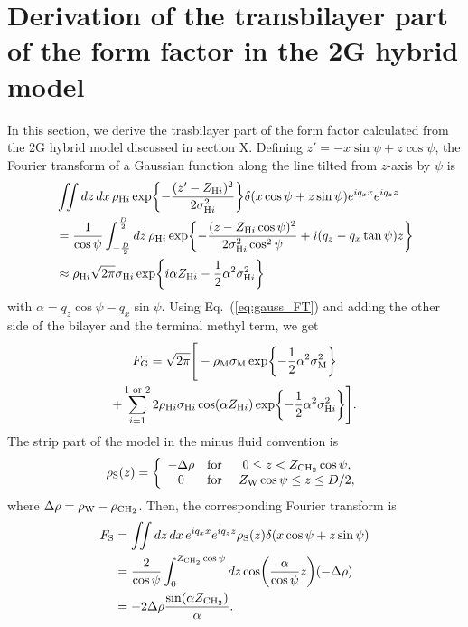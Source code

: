 \section{Derivation of the transbilayer part of the form factor in the 2G hybrid model}
In this section, we derive the trasbilayer part of the form factor calculated
from the 2G hybrid model discussed in section X.
Defining $z'=-x\sin\psi+z\cos\psi$, the Fourier transform of a Gaussian function 
along the line tilted from $z$-axis by $\psi$ is
\begin{align}
  & \iint\mathop{dz}\mathop{dx} \rho_{\mathrm{H}i} \exp\mathopen{}\left\lbrace -\frac{(z'-Z_{\mathrm{H}i})^2}{2\sigma_{\mathrm{H}i}^2} \right\rbrace\mathclose{}
  \delta(x\cos\psi+z\sin\psi)e^{iq_xx}e^{iq_zz} \nonumber\\
  &= \frac{1}{\cos\psi}\int_{-\frac{D}{2}}^{\frac{D}{2}}\mathop{dz} \rho_{\mathrm{H}i} \exp\mathopen{}\left\lbrace 
    -\frac{(z-Z_{\mathrm{H}i}\cos\psi)^2}{2\sigma_{\mathrm{H}i}^2\cos^2\psi} + i(q_z-q_x\tan\psi)z
   \right\rbrace\mathclose{} \nonumber \\
  &\approx \rho_{\mathrm{H}i}\sqrt{2\pi}\sigma_{\mathrm{H}i} \,\mathrm{exp}
  \mathopen{}\left\lbrace 
    i\alpha Z_{\mathrm{H}i} - \frac{1}{2}\alpha^2\sigma_{\mathrm{H}i}^2
   \right\rbrace\mathclose{} \label{eq:gauss_FT}
\end{align}
with $\alpha=q_z\cos\psi-q_x\sin\psi$.
Using Eq.~(\ref{eq:gauss_FT}) and adding the other side of the bilayer and
the terminal methyl term, we get
\begin{multline}
  F_\mathrm{G} = \sqrt{2\pi}
  \Bigg[
    -\rho_\mathrm{M}\sigma_\mathrm{M} \exp\mathopen{}\left\lbrace 
      -\frac{1}{2}\alpha^2\sigma_\mathrm{M}^2
     \right\rbrace\mathclose{} \\
    + \sum_{i=1}^{1\text{ or }2}2\rho_{\mathrm{H}i}\sigma_{\mathrm{H}i}
    \cos(\alpha Z_{\mathrm{H}i})
    \,\mathrm{exp}\mathopen{}\left\lbrace -\frac{1}{2}\alpha^2\sigma_{\mathrm{H}i}^2 \right\rbrace\mathclose{}
  \Bigg].
\end{multline}
The strip part of the 
model in the minus fluid convention is
\begin{equation}
  \rho_\mathrm{S}(z) = \left\{
    \begin{array}{ccc}
      -\Delta\rho & \text{for } & 0 \leq z < Z_\mathrm{CH_2}\cos\psi, \\
      0   & \text{for } & Z_\mathrm{W}\cos\psi \leq z \leq D/2,
    \end{array}
  \right.
\end{equation}
where $\Delta\rho=\rho_\mathrm{W}-\rho_\mathrm{CH_2}$.
Then, the corresponding Fourier transform is 
\begin{align}
  F_\mathrm{S} 
  &= \iint\mathop{dz}\mathop{dx} e^{iq_xx}e^{iq_zz} \rho_\mathrm{S}(z)\delta(x\cos\psi+z\sin\psi) \nonumber\\
  &= \frac{2}{\cos\psi} \int_0^{Z_\mathrm{CH_2}\cos\psi}\mathop{dz}\cos\mathopen{}\left( \frac{\alpha}{\cos\psi} z \right)\mathclose{}(-\Delta\rho) \nonumber\\
  &= -2\Delta\rho\frac{\sin(\alpha Z_\mathrm{CH_2})}{\alpha}.
\end{align} 
